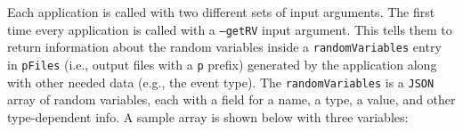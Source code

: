 
Each application is called with two different sets of input arguments. The first time every application is called with a \texttt{–getRV} input argument. This tells them to return information about the random variables inside a \texttt{randomVariables} entry in \texttt{pFiles} (i.e., output files with a \texttt{p} prefix) generated by the application along with other needed data (e.g., the event type). The \texttt{randomVariables} is a \texttt{JSON} array of random variables, each with a field for a name, a type, a value, and other type-dependent info. A sample array is shown below with three variables:\\

